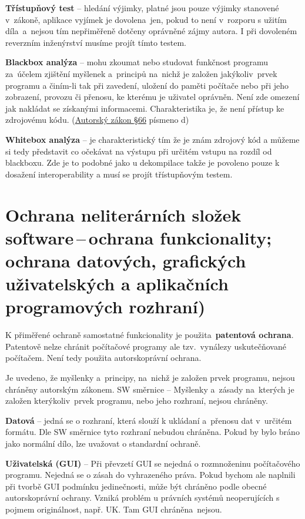 \textbf{Třístupňový test} -- hledání výjimky, platné jsou pouze výjimky stanovené v~zákoně, aplikace vyjímek je dovolena~jen, pokud to není v~rozporu s užitím díla~a~nejsou tím nepřiměřeně dotčeny oprávněné zájmy autora. I při dovoleném reverzním inženýrství musíme projít tímto testem.

\textbf{Blackbox analýza} -- mohu zkoumat nebo studovat funkčnost programu za~účelem zjištění myšlenek a~principů na~nichž je založen jakýkoliv~prvek programu a činím-li tak při zavedení, uložení do paměti počítače nebo při jeho zobrazení, provozu či přenosu, ke kterému je uživatel oprávněn. Není zde omezení jak nakládat se získanými informacemi. Charakteristika je, že není přístup ke zdrojovému kódu.  (\href{https://www.zakonyprolidi.cz/cs/2000-121#p66}{Autorský zákon §66} písmeno d)

\textbf{Whitebox analýza} -- je charakteristický tím že je znám zdrojový kód a můžeme si tedy představit co očekávat na výstupu při určitém vstupu na rozdíl od blackboxu. Zde je to podobné jako u dekompilace takže je povoleno pouze k dosažení interoperability a musí se projít třístupňovým testem.










\newpage
\section{Ochrana neliterárních složek software\,--\,ochrana funkcionality; ochrana datových, grafických uživatelských a aplikačních programových rozhraní)}

K přiměřené ochraně samostatné funkcionality je použita~\textbf{patentová ochrana}. Patentově nelze chránit počítačové programy ale tzv.\ vynálezy uskutečňované počítačem. Není tedy použita autorskoprávní ochrana.

Je uvedeno, že myšlenky a~principy, na~nichž je založen prvek programu, nejsou chráněny autorským zákonem. SW směrnice -- Myšlenky a~zásady na~kterých je založen kterýkoliv~prvek programu, nebo jeho rozhraní, nejsou chráněny. 

\textbf{Datová} -- jedná se o rozhraní, která slouží k ukládaní a~přenosu dat v~určitém formátu. Dle SW směrnice tyto rozhraní nebudou chráněna. Pokud by bylo bráno jako normální dílo, lze uvažovat o standardní ochraně.

\textbf{Uživatelská (GUI)} -- Při převzetí GUI se nejedná o rozmnoženinu počítačového programu. \textrightarrow Nejedná se o zásah do vyhrazeného práva. Pokud bychom ale naplnili při tvorbě GUI podmínku jedinečnosti, může být chráněno podle obecné autorskoprávní ochrany. Vzniká problém u právních systémů neoperujících s pojmem originálnost, např. UK. Tam GUI chráněna~nejsou.

